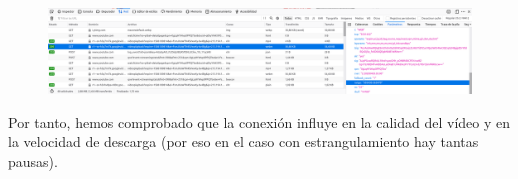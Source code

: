 \documentclass[11pt,a4paper]{article}
\begin{document}
\begin{itemize}
	\begin{figure}[H]
		\centering
		\includegraphics[scale=0.22]{img/rangeaudio2g.png}
	\end{figure}
		
\end{itemize}

Por tanto, hemos comprobado que la conexión influye en la calidad del vídeo y en la velocidad de descarga (por eso en el caso con estrangulamiento hay tantas pausas).
\end{document}
